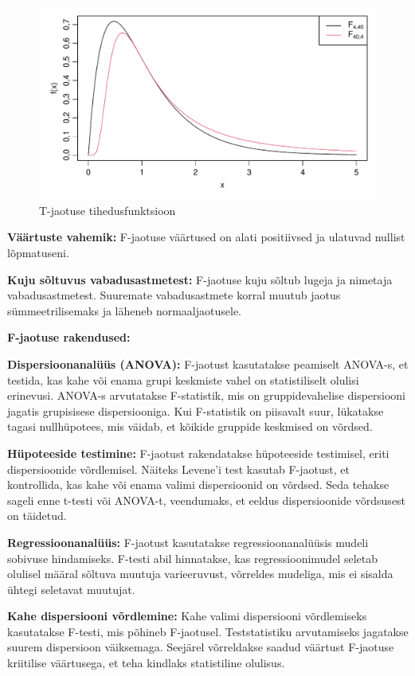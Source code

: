 \documentclass[
]{book}
\begin{document}
\begin{figure}[H]
\includegraphics[width=0.8\linewidth]{_main_files/figure-latex/unnamed-chunk-38-1} \caption{T-jaotuse tihedusfunktsioon}\label{fig:unnamed-chunk-38}
\end{figure}

\textbf{Väärtuste vahemik:} F-jaotuse väärtused on alati positiivsed ja ulatuvad nullist lõpmatuseni.

\textbf{Kuju sõltuvus vabadusastmetest:} F-jaotuse kuju sõltub lugeja ja nimetaja vabadusastmetest. Suuremate vabadusastmete korral muutub jaotus sümmeetrilisemaks ja läheneb normaaljaotusele.

\textbf{F-jaotuse rakendused:}

\textbf{Dispersioonanalüüs (ANOVA):} F-jaotust kasutatakse peamiselt ANOVA-s, et testida, kas kahe või enama grupi keskmiste vahel on statistiliselt olulisi erinevusi. ANOVA-s arvutatakse F-statistik, mis on gruppidevahelise dispersiooni jagatis grupisisese dispersiooniga. Kui F-statistik on piisavalt suur, lükatakse tagasi nullhüpotees, mis väidab, et kõikide gruppide keskmised on võrdsed.

\textbf{Hüpoteeside testimine:} F-jaotust rakendatakse hüpoteeside testimisel, eriti dispersioonide võrdlemisel. Näiteks Levene'i test kasutab F-jaotust, et kontrollida, kas kahe või enama valimi dispersioonid on võrdsed. Seda tehakse sageli enne t-testi või ANOVA-t, veendumaks, et eeldus dispersioonide võrdsusest on täidetud.

\textbf{Regressioonanalüüs:} F-jaotust kasutatakse regressioonanalüüsis mudeli sobivuse hindamiseks. F-testi abil hinnatakse, kas regressioonimudel seletab olulisel määral sõltuva muutuja varieeruvust, võrreldes mudeliga, mis ei sisalda ühtegi seletavat muutujat.

\textbf{Kahe dispersiooni võrdlemine:} Kahe valimi dispersiooni võrdlemiseks kasutatakse F-testi, mis põhineb F-jaotusel. Teststatistiku arvutamiseks jagatakse suurem dispersioon väiksemaga. Seejärel võrreldakse saadud väärtust F-jaotuse kriitilise väärtusega, et teha kindlaks statistiline olulisus.
\end{document}
